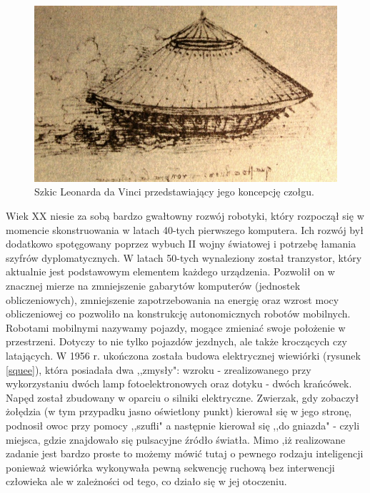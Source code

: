   \begin{figure}[H]
    \begin{center}
      \includegraphics[scale=0.25]{imgs/Leonardo_tank.jpg}
 	\caption[Czołg Leonarda da Vinci]{\small{Szkic Leonarda da Vinci przedstawiający jego koncepcję czołgu.}\footnotemark}
	\label{czolg_leon}
    \end{center}
  \end{figure}
Wiek XX niesie za sobą bardzo gwałtowny rozwój robotyki, który rozpoczął się w momencie skonstruowania w latach 40-tych pierwszego komputera. Ich rozwój był dodatkowo spotęgowany poprzez wybuch II wojny światowej i potrzebę łamania szyfrów dyplomatycznych.
W latach 50-tych wynaleziony został tranzystor, który aktualnie jest podstawowym elementem każdego urządzenia. Pozwolił on w znacznej mierze na zmniejszenie gabarytów komputerów (jednostek obliczeniowych), zmniejszenie zapotrzebowania na energię oraz wzrost mocy obliczeniowej co pozwoliło na konstrukcję autonomicznych robotów mobilnych.
Robotami mobilnymi nazywamy pojazdy, mogące zmieniać swoje położenie w przestrzeni. Dotyczy to nie tylko pojazdów jezdnych, ale także kroczących czy latających. 
W 1956 r. ukończona została budowa elektrycznej wiewiórki\cite{robot_squee} (rysunek \ref{squee}), która posiadała dwa ,,zmysły": wzroku - zrealizowanego przy wykorzystaniu dwóch lamp fotoelektronowych oraz dotyku - dwóch krańcówek.  Napęd został zbudowany w oparciu o silniki elektryczne. Zwierzak, gdy zobaczył żołędzia (w tym przypadku jasno oświetlony punkt) kierował się w jego stronę, podnosił owoc przy pomocy ,,szufli" a następnie kierował się ,,do gniazda" - czyli miejsca, gdzie znajdowało się pulsacyjne źródło światła. Mimo ,iż realizowane zadanie jest bardzo proste to możemy mówić tutaj o pewnego rodzaju inteligencji ponieważ wiewiórka wykonywała pewną sekwencję ruchową bez interwencji człowieka ale w zależności od tego, co działo się w jej otoczeniu.

